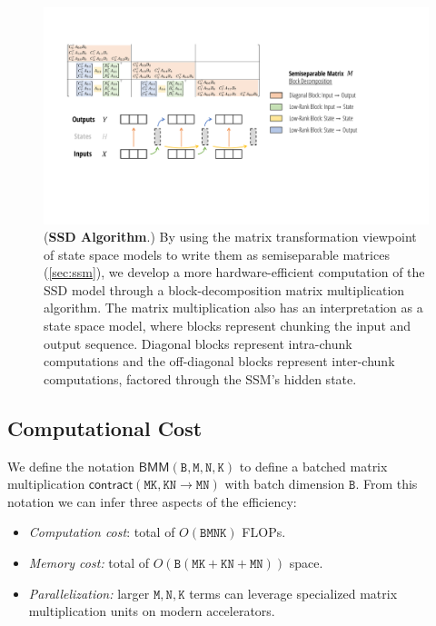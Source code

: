 \begin{figure}[!t]
\centering
\includegraphics[width=\linewidth]{fig/ssd_algorithm.pdf}
\caption{
  (\textbf{SSD Algorithm}.)
  By using the matrix transformation viewpoint of state space models to write them as semiseparable matrices (\cref{sec:ssm}), we develop a more hardware-efficient computation of the SSD model through a block-decomposition matrix multiplication algorithm.
  The matrix multiplication also has an interpretation as a state space model,
  where blocks represent chunking the input and output sequence.
  Diagonal blocks represent intra-chunk computations and the off-diagonal blocks represent inter-chunk computations, factored through the SSM's hidden state.
}
\label{fig:ssd-algorithm}
\end{figure}

\subsection{Computational Cost}

We define the notation $\mathsf{BMM}(\mathtt{B}, \mathtt{M}, \mathtt{N}, \mathtt{K})$ to define a batched matrix multiplication $\mathsf{contract}(\mathtt{\mathtt{MK},\mathtt{KN} \to \mathtt{MN}})$ with batch dimension $\mathtt{B}$.
From this notation we can infer three aspects of the efficiency:
\begin{itemize}
  \item \emph{Computation cost}: total of $O(\mathtt{BMNK})$ FLOPs.
  \item \emph{Memory cost:} total of $O(\mathtt{B}(\mathtt{MK}+\mathtt{KN}+\mathtt{MN}))$ space.
  \item \emph{Parallelization:} larger $\mathtt{M}, \mathtt{N}, \mathtt{K}$ terms can leverage specialized matrix multiplication units on modern accelerators.
\end{itemize}

